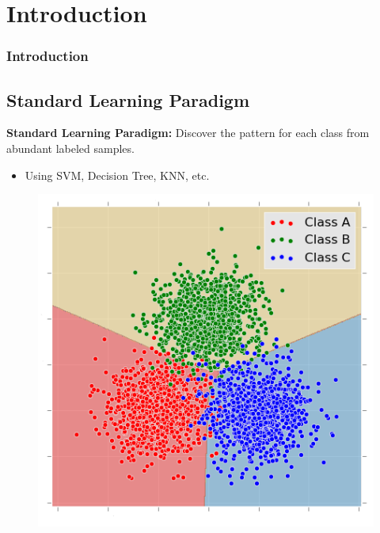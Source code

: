 \documentclass{beamer}
\begin{document}
\section{Introduction}
\begin{frame}
  \frametitle{Introduction}
    \subsection{Standard Learning Paradigm}
    \textbf{Standard Learning Paradigm:}
    Discover the pattern for each class from abundant labeled samples.
    \begin{itemize}
      \item Using SVM, Decision Tree, KNN, etc.
    \end{itemize}
    \begin{figure}
    \includegraphics[width= 0.5\linewidth]{multi.png}
    \end{figure}
\end{frame}
\end{document}

